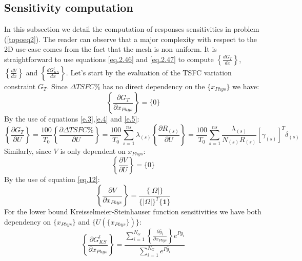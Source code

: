  \subsection{Sensitivity computation}
 \label{subsec2.4}
 In this subsection we detail the computation of responses sensitivities in problem (\ref{topoeq2}). The reader can observe that a major complexity with respect to the 2D use-case comes from the fact that the mesh is non uniform.
  It is straightforward to use equations \ref{eq.2.46} and \ref{eq.2.47} to compute $\left\lbrace\frac{d G_T}{dx}\right\rbrace$, $\left\lbrace\frac{d V}{dx}\right\rbrace$ and $\left\lbrace\frac{d G_{KS}^l}{dx}\right\rbrace$. Let's start by the evaluation of the TSFC variation constraint $G_T$. Since $ \Delta TSFC \%$ has no direct dependency on the $\lbrace x_{Phys}\rbrace$ we have:
    \begin{equation}
   \left \lbrace\frac{\partial G_T}{\partial x_{Phys}}\right \rbrace=\lbrace 0\rbrace 
    \end{equation}
     By the use of equations \ref{e.3},\ref{e.4} and \ref{e.5}:
    \begin{equation}
      \left \lbrace\frac{\partial G_T}{\partial U}\right \rbrace=\frac{100 }{T_0}\left \lbrace\frac{\partial \Delta TSFC \%}{\partial U}\right \rbrace =\frac{100 }{T_0}\sum_{s=1}^{ns}\lambda_{(s)}\left \lbrace\frac{\partial R_{(s)}}{\partial U}\right \rbrace=\frac{100}{T_0}\sum_{s=1}^{ns}\frac{\lambda_{(s)}}{N_{(s)}R_{(s)}}\left[\gamma_{(s)}\right] ^T\delta_{(s)}
       \end{equation}
       Similarly, since $V$ is only dependent on $x_{Phys}$:
 \begin{equation}
           \left\lbrace\frac{\partial V}{\partial U}\right\rbrace=\lbrace 0\rbrace 
 \end{equation}
 By the use of equation \ref{eq.12}:
    \begin{equation}
                     \left\lbrace\frac{\partial V}{\partial x_{Phys}}\right\rbrace=\frac{\lbrace|\Omega|\rbrace}{\lbrace|\Omega|\rbrace^T\lbrace \mathbf{1}\rbrace}
     \end{equation}
 For the lower bound Kreisselmeier-Steinhauser
 function sensitivities we have both dependency on $\lbrace x_{Phys}\rbrace$ and $\lbrace U (\lbrace x_{Phys}\rbrace) \rbrace$: 
   \begin{equation}
   \left\lbrace\frac{\partial G^{l}_{KS}}{\partial x_{Phys}}\right\rbrace=\frac{\sum_{i=1}^{N_G}\left\lbrace\frac{\partial \bar{g}_i}{\partial x_{Phys}}\right \rbrace e^{P\bar{g}_i}}{\sum_{i=1}^{N_G}e^{P\bar{g}_i}}
   \end{equation}
